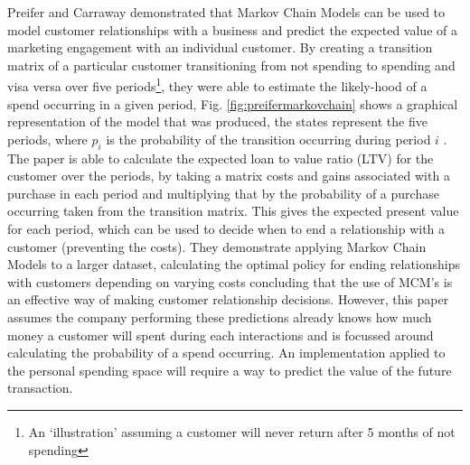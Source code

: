 Preifer and Carraway demonstrated that Markov Chain Models can be used to model customer relationships with a business and predict the expected value of a marketing engagement with an individual customer. By creating a transition matrix of a particular customer transitioning from not spending to spending and visa versa over five periods\footnote{An `illustration' assuming a customer will never return after 5 months of not spending}, they were able to estimate the likely-hood of a spend occurring in a given period, Fig. \ref{fig:preifermarkovchain} shows a graphical representation of the model that was produced, the states represent the five periods, where $p_{i}$ is the probability of the transition occurring during period $i$ \cite{pfeifer2000modeling}.
% 
The paper is able to calculate the expected loan to value ratio (LTV) for the customer over the periods, by taking a matrix costs and gains associated with a purchase in each period and multiplying that by the probability of a purchase occurring taken from the transition matrix. This gives the expected present value for each period, which can be used to decide when to end a relationship with a customer (preventing the costs).
%
They demonstrate applying Markov Chain Models to a larger dataset, calculating the optimal policy for ending relationships with customers depending on varying costs concluding that the use of MCM's is an effective way of making customer relationship decisions. However, this paper assumes the company performing these predictions already knows how much money a customer will spent during each interactions and is focussed around calculating the probability of a spend occurring. An implementation applied to the personal spending space will require a way to predict the value of the future transaction.

